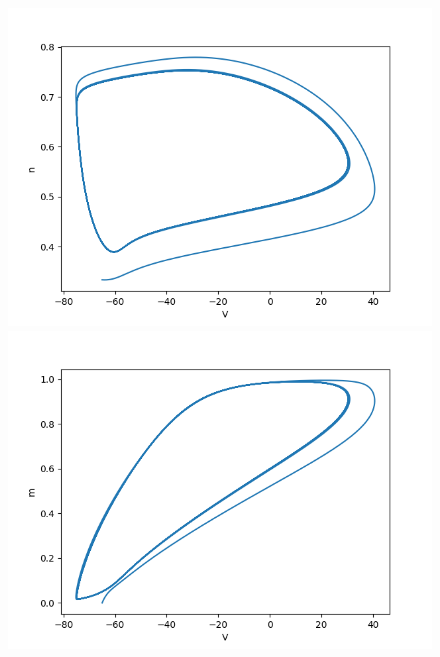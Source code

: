 \documentclass[12pt]{scrartcl}
\begin{document}
\begin{figure}[!h]
\begin{minipage}[l]{.3\linewidth}
\centering
\includegraphics[scale=0.35]{imgs/hh22.png}
    \end{minipage}\hfill
\begin{minipage}[l]{.3\linewidth}
\centering
\includegraphics[scale=0.35]{imgs/hh23.png}
    \end{minipage}\hfill
\begin{minipage}[l]{.3\linewidth}
\centering

\end{minipage}
\end{figure}
\end{document}

